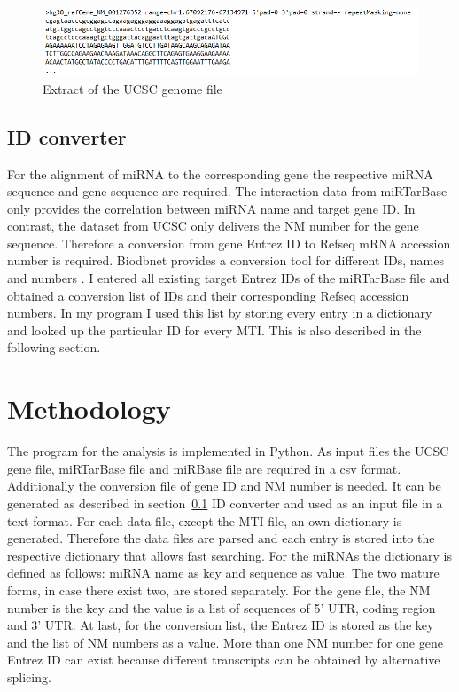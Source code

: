 \documentclass[11pt, a4paper, twoside]{book}
\begin{document}
\begin{figure}[h]
\centering
\includegraphics[width=\textwidth]{results/ucsc.png}
\caption{Extract of the UCSC genome file}
\label{ucsc_scrot}
\end{figure}



\subsection{ID converter}
\label{sec:id}
For the alignment of miRNA to the corresponding gene the respective miRNA sequence and gene sequence are required. The interaction data from miRTarBase only provides the correlation between miRNA name and target gene ID. In contrast, the dataset from UCSC only delivers the NM number for the gene sequence. Therefore a conversion from gene Entrez ID to Refseq mRNA accession number is required. Biodbnet provides a conversion tool for different IDs, names and numbers \cite{biodb}. I entered all existing target Entrez IDs of the miRTarBase file and obtained a conversion list of IDs and their corresponding Refseq accession numbers. In my program I used this list by storing every entry in a dictionary and looked up the particular ID for every MTI. This is also described in the following section.
 


\vspace{1cm}


\section{Methodology}
\label{sec:meth}


The program for the analysis is implemented in Python. As input files the UCSC gene file, miRTarBase file and miRBase file are required in a csv format. Additionally the conversion file of gene ID and NM number is needed. It can be generated as described in section~\ref{sec:id} ID converter and used as an input file in a text format. 
For each data file, except the MTI file, an own dictionary is generated. Therefore the data files are parsed and each entry is stored into the respective dictionary that allows fast searching. For the miRNAs the dictionary is defined as follows: miRNA name as key and sequence as value. The two mature forms, in case there exist two, are stored separately. For the gene file, the NM number is the key and the value is a list of sequences of 5' UTR, coding region and 3' UTR. At last, for the conversion list, the Entrez ID is stored as the key and the list of NM numbers as a value. More than one NM number for one gene Entrez ID can exist because different transcripts can be obtained by alternative splicing. \\
\end{document}
